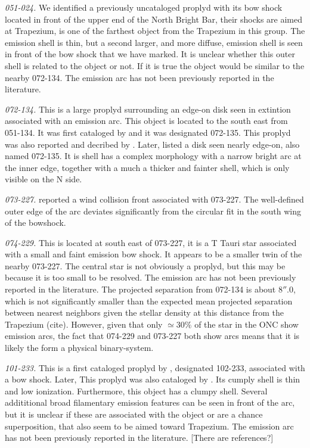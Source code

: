 \documentclass{article}
\begin{document}
\textit{051-024.} We identified a previously uncataloged proplyd with its bow shock located in front of the upper end of the North Bright Bar, their shocks are aimed at Trapezium, is one of the farthest object from the Trapezium in this group. The emission shell is thin, but a second larger, and more diffuse, emission shell is seen in front of the bow shock that we have marked. It is unclear whether this outer shell is related to the object or not. If it is true the object would be similar to the nearby 072-134. The emission arc has not been previously reported in the literature. 

\textit{072-134.} This is a large proplyd surrounding an edge-on disk seen in extintion associated with an emission arc. This object is located to the south east from 051-134. It was first cataloged by \citet{Odell:1996} and it was designated 072-135. This proplyd was also reported and decribed by \citet{Bally:2000a}. Later, \citet{Ricci:2008} listed a disk seen nearly edge-on, also named 072-135. It is shell has a complex morphology with a narrow bright arc at the inner edge, together with a much a thicker and fainter shell, which is only visible on the N side.         

\textit{073-227.} \citet{Bally:2000a} reported a wind collision front associated with 073-227. The well-defined outer edge of the arc deviates significantly from the circular fit in the south wing of the bowshock.
   
\textit{074-229.} This is located at south east of 073-227, it is a T Tauri star associated with a small and faint emission bow shock. It appears to be a smaller twin of the nearby 073-227. The central star is not obviously a proplyd, but this may be because it is too small to be resolved. The emission arc has not been previously reported in the literature. The projected separation from 072-134 is about \(8''.0\), which is not significantly smaller than the expected mean projected separation between nearest neighbors given the stellar density at this distance from the Trapezium (cite). However, given that only \(\simeq30\%\) of the star in the ONC show emission arcs, the fact that 074-229 and 073-227 both show arcs means that it is likely the form a  physical binary-system.
 
\textit{101-233.} This is a first cataloged proplyd by \citet{Odell:1996}, designated 102-233, associated with a bow shock. Later, This proplyd was also cataloged by \citet{Ricci:2008}. Its cumply shell is thin and low ionization. Furthermore, this object has a clumpy shell. Several addititional broad filamentary emission features can be seen in front of the arc, but it is unclear if these are associated with the object or are a chance superposition, that also seem to be aimed toward Trapezium. The emission arc has not been previously reported in the literature. [There are references?]   
\end{document}
